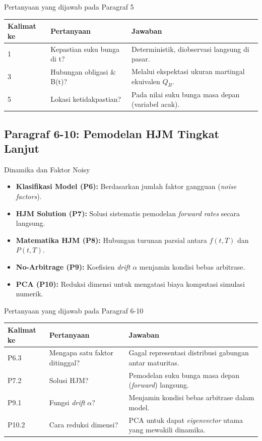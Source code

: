 \begin{frame}{Pertanyaan yang dijawab pada Paragraf 5}
    \centering
    \small
    \begin{tabular}{lp{4.5cm}p{6cm}}
        \toprule
        Kalimat ke & Pertanyaan & Jawaban \\
        \midrule
        1 & Kepastian suku bunga di t? & Deterministik, diobservasi langsung di pasar. \\
        3 & Hubungan obligasi \& B(t)? & Melalui ekspektasi ukuran martingal ekuivalen $Q_B$. \\
        5 & Lokasi ketidakpastian? & Pada nilai suku bunga masa depan (variabel acak). \\
        \bottomrule
    \end{tabular}
\end{frame}

\subsection{Paragraf 6-10: Pemodelan HJM Tingkat Lanjut}
\begin{frame}{Dinamika dan Faktor Noisy}
    \begin{itemize}
        \item \textbf{Klasifikasi Model (P6):} Berdasarkan jumlah faktor gangguan (\textit{noise factors}).
        \item \textbf{HJM Solution (P7):} Solusi sistematis pemodelan \textit{forward rates} secara langsung.
        \item \textbf{Matematika HJM (P8):} Hubungan turunan parsial antara $f(t,T)$ dan $P(t,T)$.
        \item \textbf{No-Arbitrage (P9):} Koefisien \textit{drift} $\alpha$ menjamin kondisi bebas arbitrase.
        \item \textbf{PCA (P10):} Reduksi dimensi untuk mengatasi biaya komputasi simulasi numerik.
    \end{itemize}
\end{frame}

\begin{frame}{Pertanyaan yang dijawab pada Paragraf 6-10}
    \centering
    \small
    \begin{tabular}{lp{4.5cm}p{6cm}}
        \toprule
        Kalimat ke & Pertanyaan & Jawaban \\
        \midrule
        P6.3 & Mengapa satu faktor ditinggal? & Gagal representasi distribusi gabungan antar maturitas. \\
        P7.2 & Solusi HJM? & Pemodelan suku bunga masa depan (\textit{forward}) langsung. \\
        P9.1 & Fungsi \textit{drift} $\alpha$? & Menjamin kondisi bebas arbitrase dalam model. \\
        P10.2 & Cara reduksi dimensi? & PCA untuk dapat \textit{eigenvector} utama yang mewakili dinamika. \\
        \bottomrule
    \end{tabular}
\end{frame}
